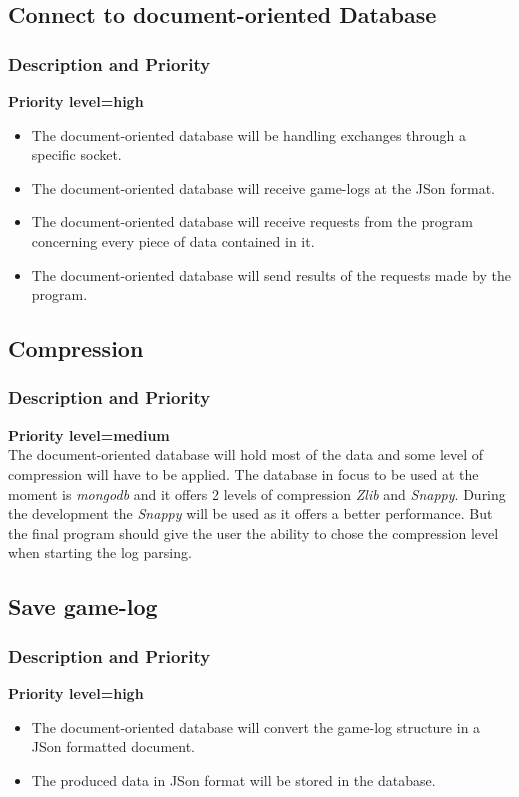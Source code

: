 \documentclass{scrreprt}
\begin{document}
\subsection{Connect to document-oriented Database}
\subsubsection{Description and Priority}
\textbf{Priority level=high}\\
\begin{itemize}
\item The document-oriented database will be handling exchanges through a specific socket.
\item The document-oriented database will receive game-logs at the JSon format.
\item The document-oriented database will receive requests from the program concerning every piece of data contained in it.
\item The document-oriented database will send results of the requests made by the program.
\end{itemize}


\subsection{Compression}
\subsubsection{Description and Priority}
\textbf{Priority level=medium}\\
The document-oriented database will hold most of the data and some level of compression
will have to be applied.
The database in focus to be used at the moment is \textit{mongodb} and it offers
2 levels of compression \textit{Zlib} and \textit{Snappy}.
During the development the \textit{Snappy} will be used as it offers a better
performance.
But the final program should give the user the ability to chose the compression
level when starting the log parsing.


\subsection{Save game-log}
\subsubsection{Description and Priority}
\textbf{Priority level=high}\\
\begin{itemize}
\item The document-oriented database will convert the game-log structure in a JSon formatted document.
\item The produced data in JSon format will be stored in the database.
\end{itemize}
\end{document}
